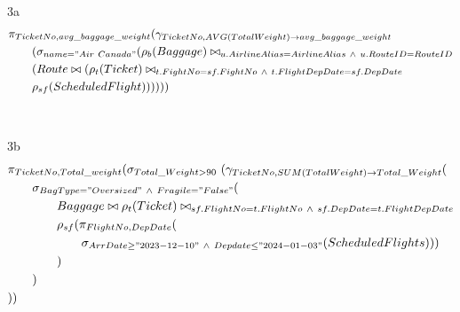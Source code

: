 \documentclass[fleqn]{article}
\begin{document}
\noindent 3a \\
\begin{equation*}
    \begin{aligned}
    &\pi_{TicketNo, avg\_baggage\_weight} (\gamma_{TicketNo, AVG(TotalWeight)\rightarrow avg\_baggage\_weight}\\
    &\qquad (\sigma_{name="Air\ Canada"} (\rho_b(Baggage) \bowtie_{u.AirlineAlias=AirlineAlias\ \land \ u.RouteID=RouteID} \\
    &\qquad ( Route \bowtie (\rho_t (Ticket) \bowtie_{t.FightNo=sf.FightNo\ \land \ t.FlightDepDate=sf.DepDate} \\
 &\qquad \rho_{sf}(ScheduledFlight)))))) \\
    \end{aligned}
\end{equation*}
\\
\\
3b \\
\begin{equation*}
    \begin{aligned}
    & \pi_{TicketNo, Total\_weight}(\sigma_{Total\_Weight > 90} \ (\gamma_{TicketNo, SUM(TotalWeight)\rightarrow Total\_Weight}( \\
    & \qquad \sigma_{BagType = "Oversized" \ \land \ Fragile="False"}(\\
    & \qquad \qquad Baggage \bowtie \rho_t(Ticket) \bowtie_{sf.FlightNo = t.FlightNo \ \land \ sf.DepDate = t.FlightDepDate} \\
    & \qquad \qquad \rho_{sf}(\pi_{FlightNo, DepDate} ( \\ 
    & \qquad \qquad \qquad \sigma_{ArrDate \geq "2023-12-10" \ \land \ Depdate \leq "2024-01-03"}(ScheduledFlights))) \\
    & \qquad \qquad ) \\
    & \qquad ) \\
    & )) \\
    \end{aligned}
\end{equation*} \\
\end{document}
